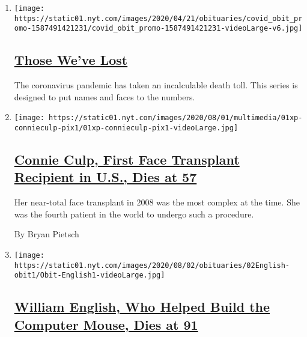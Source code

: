 \begin{enumerate}
\def\labelenumi{\arabic{enumi}.}
\item
  \texttt{[image: https://static01.nyt.com/images/2020/04/21/obituaries/covid\_obit\_promo-1587491421231/covid\_obit\_promo-1587491421231-videoLarge-v6.jpg]}

  \hypertarget{those-weve-lost}{%
  \subsection{\texorpdfstring{\href{https://www.nytimes.com/interactive/2020/obituaries/people-died-coronavirus-obituaries.html}{Those
  We've Lost}}{Those We've Lost}}\label{those-weve-lost}}

  The coronavirus pandemic has taken an incalculable death toll. This
  series is designed to put names and faces to the numbers.
\item
  \texttt{[image: https://static01.nyt.com/images/2020/08/01/multimedia/01xp-connieculp-pix1/01xp-connieculp-pix1-videoLarge.jpg]}

  \hypertarget{connie-culp-first-face-transplant-recipient-in-us-dies-at-57}{%
  \subsection{\texorpdfstring{\href{/2020/08/01/us/Connie-culp-dead-face-transplant.html}{Connie
  Culp, First Face Transplant Recipient in U.S., Dies at
  57}}{Connie Culp, First Face Transplant Recipient in U.S., Dies at 57}}\label{connie-culp-first-face-transplant-recipient-in-us-dies-at-57}}

  Her near-total face transplant in 2008 was the most complex at the
  time. She was the fourth patient in the world to undergo such a
  procedure.

  By Bryan Pietsch
\item
  \texttt{[image: https://static01.nyt.com/images/2020/08/02/obituaries/02English-obit1/Obit-English1-videoLarge.jpg]}

  \hypertarget{william-english-who-helped-build-the-computer-mouse-dies-at-91}{%
  \subsection{\texorpdfstring{\href{/2020/07/31/technology/william-english-who-helped-build-the-computer-mouse-dies-at-91.html}{William
  English, Who Helped Build the Computer Mouse, Dies at
  91}}{William English, Who Helped Build the Computer Mouse, Dies at 91}}\label{william-english-who-helped-build-the-computer-mouse-dies-at-91}}


\end{enumerate}
